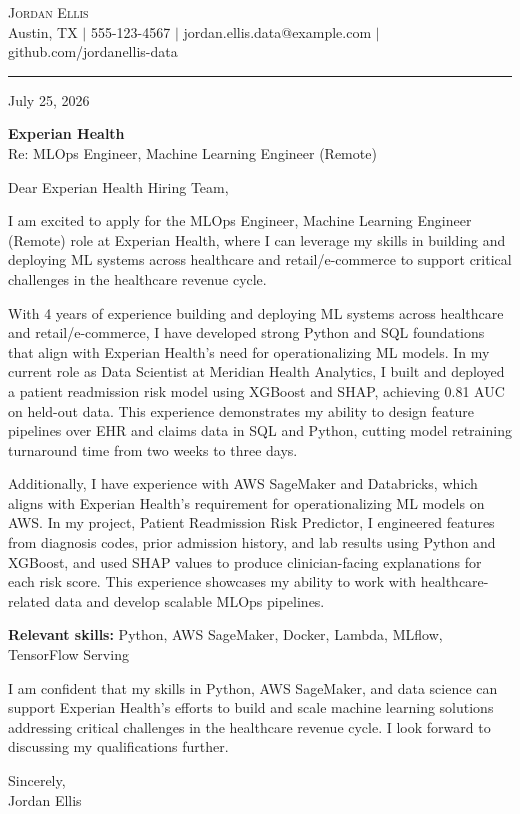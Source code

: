 \documentclass[letterpaper,11pt]{article}
\begin{document}
\begin{center}
    {\Large \scshape Jordan Ellis} \\ \vspace{2pt}
    \small Austin, TX $|$ 555-123-4567 $|$ jordan.ellis.data@example.com $|$ github.com/jordanellis-data
\end{center}
\vspace{6pt}
\hrule
\vspace{10pt}

July 25, 2026

\textbf{Experian Health} \\
Re: MLOps Engineer, Machine Learning Engineer (Remote)

\vspace{4pt}

Dear Experian Health Hiring Team,

I am excited to apply for the MLOps Engineer, Machine Learning Engineer (Remote) role at Experian Health, where I can leverage my skills in building and deploying ML systems across healthcare and retail/e-commerce to support critical challenges in the healthcare revenue cycle.

With 4 years of experience building and deploying ML systems across healthcare and retail/e-commerce, I have developed strong Python and SQL foundations that align with Experian Health's need for operationalizing ML models. In my current role as Data Scientist at Meridian Health Analytics, I built and deployed a patient readmission risk model using XGBoost and SHAP, achieving 0.81 AUC on held-out data. This experience demonstrates my ability to design feature pipelines over EHR and claims data in SQL and Python, cutting model retraining turnaround time from two weeks to three days.

Additionally, I have experience with AWS SageMaker and Databricks, which aligns with Experian Health's requirement for operationalizing ML models on AWS. In my project, Patient Readmission Risk Predictor, I engineered features from diagnosis codes, prior admission history, and lab results using Python and XGBoost, and used SHAP values to produce clinician-facing explanations for each risk score. This experience showcases my ability to work with healthcare-related data and develop scalable MLOps pipelines.

\textbf{Relevant skills:} Python, AWS SageMaker, Docker, Lambda, MLflow, TensorFlow Serving

I am confident that my skills in Python, AWS SageMaker, and data science can support Experian Health's efforts to build and scale machine learning solutions addressing critical challenges in the healthcare revenue cycle. I look forward to discussing my qualifications further.

\vspace{10pt}
Sincerely, \\
Jordan Ellis
\end{document}
